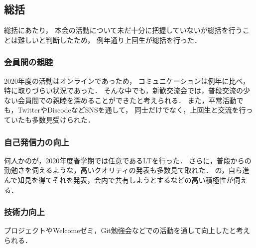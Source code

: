 \subsection*{\firstGrade{}総括}



\firstGrade{}総括にあたり，
本会の活動について未だ十分に把握していない\firstGrade{}が総括を行うことは難しいと判断したため，
例年通り上回生が総括を行った．


\subsubsection*{会員間の親睦}
2020年度の活動はオンラインであっため，
コミュニケーションは例年に比べ，特に取りづらい状況であった．
そんな中でも，新歓交流会では，普段交流の少ない会員間での親睦を深めることができたと考えられる．
また，平常活動でも，TwitterやDiscodeなどSNSを通して，
\firstGrade{}同士だけでなく，上回生と交流を行っていた\firstGrade{}も多数見受けられた．


\subsubsection*{自己発信力の向上}
何人かの\firstGrade{}が，2020年度春学期では任意であるLTを行った．
さらに，普段からの勤勉さを伺えるような，高いクオリティの発表も多数見て取れた．
\firstGrade{}の，自ら進んで知見を得てそれを発表，会内で共有しようとするなどの高い積極性が伺える．


\subsubsection*{技術力向上}
プロジェクトやWelcomeゼミ，Git勉強会などでの活動を通して向上したと考えられる．
